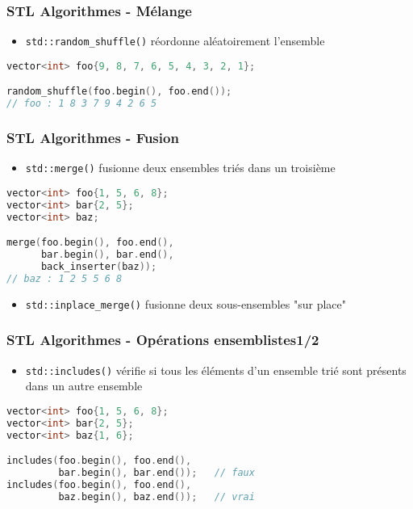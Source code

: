 \documentclass[C++.tex]{subfiles}
\begin{document}
\begin{frame}[fragile]
	\frametitle{STL Algorithmes - Mélange}
	\begin{itemize}
		\item \lstinline|std::random_shuffle()| réordonne aléatoirement l'ensemble
	\end{itemize}

	\begin{lstlisting}[language=C++]
vector<int> foo{9, 8, 7, 6, 5, 4, 3, 2, 1};

random_shuffle(foo.begin(), foo.end());
// foo : 1 8 3 7 9 4 2 6 5\end{lstlisting}
\end{frame}

\begin{frame}[fragile]
	\frametitle{STL Algorithmes - Fusion}
	\begin{itemize}
		\item \lstinline|std::merge()| fusionne deux ensembles triés dans un troisième
	\end{itemize}


	\begin{lstlisting}[language=C++]
vector<int> foo{1, 5, 6, 8};
vector<int> bar{2, 5};
vector<int> baz;

merge(foo.begin(), foo.end(), 
      bar.begin(), bar.end(), 
      back_inserter(baz));
// baz : 1 2 5 5 6 8\end{lstlisting}

	\begin{itemize}
		\item \lstinline|std::inplace_merge()| fusionne deux sous-ensembles "sur place"
	\end{itemize}

\end{frame}

\begin{frame}[fragile]
	\frametitle{STL Algorithmes - Opérations ensemblistes\titlehfill{}1/2}
	\begin{itemize}
		\item \lstinline|std::includes()| vérifie si tous les éléments d'un ensemble trié sont présents dans un autre ensemble

	\end{itemize}

	\begin{lstlisting}[language=C++]
vector<int> foo{1, 5, 6, 8};
vector<int> bar{2, 5};
vector<int> baz{1, 6};

includes(foo.begin(), foo.end(), 
         bar.begin(), bar.end());   // faux
includes(foo.begin(), foo.end(), 
         baz.begin(), baz.end());   // vrai\end{lstlisting}
\end{frame}
\end{document}
